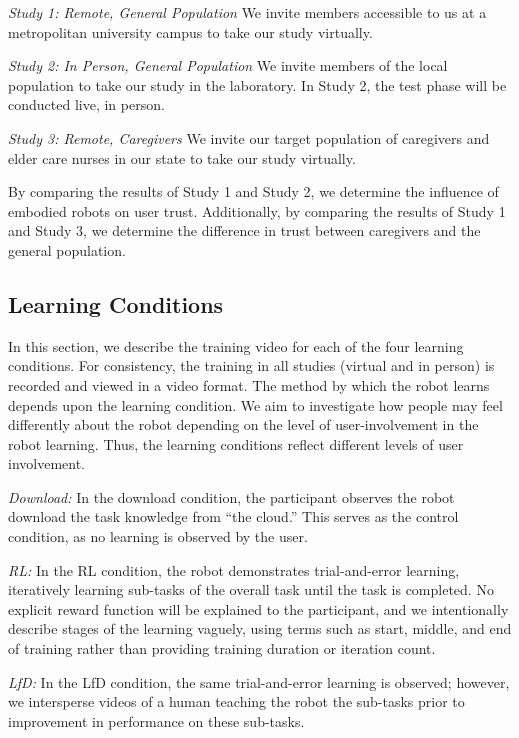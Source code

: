 \documentclass[letterpaper]{article} %
\begin{document}
\indent \textit{Study 1: Remote, General Population} We invite members accessible to us at a metropolitan university campus to take our study virtually. 

\indent \textit{Study 2: In Person, General Population} We invite members of the local population to take our study in the laboratory. In Study 2, the test phase will be conducted live, in person.

\indent \textit{Study 3: Remote, Caregivers} We invite our target population of caregivers and elder care nurses in our state to take our study virtually.

By comparing the results of Study 1 and Study 2, we determine the influence of embodied robots on user trust. Additionally, by comparing the results of Study 1 and Study 3, we determine the difference in trust between caregivers and the general population.

\subsection{Learning Conditions} 
\label{sec:conditions}
In this section, we describe the training video for each of the four learning conditions. For consistency, the training in all studies (virtual and in person) is recorded and viewed in a video format. The method by which the robot learns depends upon the learning condition. We aim to investigate how people may feel differently about the robot depending on the level of user-involvement in the robot learning. Thus, the learning conditions reflect different levels of user involvement.

\textit{Download: }In the download condition, the participant observes the robot download the task knowledge from ``the cloud.'' This serves as the control condition, as no learning is observed by the user. 

\textit{RL: }In the RL condition, the robot demonstrates trial-and-error learning, iteratively learning sub-tasks of the overall task until the task is completed. No explicit reward function will be explained to the participant, and we intentionally describe stages of the learning vaguely, using terms such as start, middle, and end of training rather than providing training duration or iteration count.

\textit{LfD: }In the LfD condition, the same trial-and-error learning is observed; however, we intersperse videos of a human teaching the robot the sub-tasks prior to improvement in performance on these sub-tasks.
\end{document}
